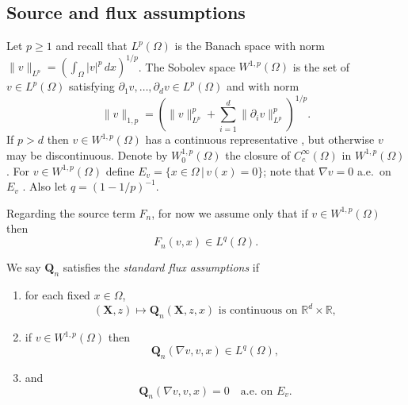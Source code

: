 \documentclass[final,onefignum]{siamart190516}
\newcommand\bQ{\mathbf{Q}}
\newcommand\bX{\mathbf{X}}
\newcommand{\grad}{\nabla}
\newcommand\RR{\mathbb{R}}
\begin{document}
\subsection{Source and flux assumptions} \label{subsec:fluxassumptions}  Let $p\ge 1$ and recall that $L^p (\Omega)$ is the Banach space with norm $\|v\|_{L^p} = \left(\int_\Omega |v|^p\,dx\right)^{1/p}$.  The Sobolev space $W^{1,p}(\Omega)$ \cite{Evans2010} is the set of $v \in L^p(\Omega)$ satisfying $\partial_1 v,\dots,\partial_d v \in L^p(\Omega)$ and with norm
\begin{equation}
  \|v\|_{1,p} = \left(\|v\|_{L^p}^p + \sum_{i=1}^d \|\partial_i v\|_{L^p}^p\right)^{1/p}.  \label{eq:norm}
\end{equation}
If $p>d$ then $v\in W^{1,p}(\Omega)$ has a continuous representative \cite[``Morrey's inequality'']{Evans2010}, but otherwise $v$ may be discontinuous.  Denote by $W_0^{1,p}(\Omega)$ the closure of $C_c^\infty(\Omega)$ in $W^{1,p}(\Omega)$.  For $v \in W^{1,p}(\Omega)$ define $E_v = \{x\in\Omega \,\big|\, v(x) = 0\}$; note that $\grad v = 0$ a.e.~on $E_v$ \cite[lemma A.4 in chapter II]{KinderlehrerStampacchia1980}.  Also let $q=(1-1/p)^{-1}$.

Regarding the source term $F_n$, for now we assume only that if $v\in W^{1,p}(\Omega)$ then
\begin{equation}
F_n(v,x) \in L^q(\Omega).  \label{eq:FisLq}
\end{equation}

\begin{definition}  \label{ass:std}  We say $\bQ_n$ satisfies the \emph{standard flux assumptions} if
\renewcommand{\labelenumi}{\emph{\roman{enumi}})}
\begin{enumerate}
\item for each fixed $x\in \Omega$,
\begin{equation}
(\bX,z) \mapsto \bQ_n(\bX,z,x) \text{ is continuous on } \RR^d \times \RR,  \label{eq:Qiscontinuous}
\end{equation}
\item if $v \in W^{1,p}(\Omega)$ then
\begin{equation}
\bQ_n(\grad v,v,x) \in L^q(\Omega), \label{eq:QisLq}
\end{equation}
\item and
\begin{equation}
\bQ_n(\grad v,v,x)=0 \quad \text{a.e.~on } E_v. \label{eq:Qiszero}
\end{equation}
\end{enumerate}
\end{definition}
\end{document}
